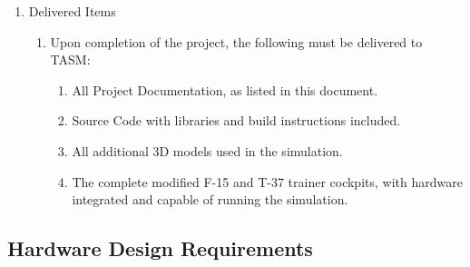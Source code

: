 \documentclass[12pt]{article} %
\begin{document}
\begin{enumerate}[label=\arabic*., leftmargin=*]
\begin{enumerate}[label=\arabic{enumi}.\arabic*., leftmargin=*]
\begin{enumerate}[label=\arabic{enumi}.\arabic{enumii}.\arabic*., leftmargin=*]
\begin{enumerate}[label=\arabic{enumi}.\arabic{enumii}.\arabic{enumiii}.\alph*., leftmargin=*]
				\item The user manual shall contain information on the start-up and shut-down of the simulation.
				\item The user manual shall contain the basic flow of the gameplay for each experience. 
				\item The user manual shall contain information on quickly restarting the simulation. 
			\end{enumerate}
			\item A detailed Maintenance Manual. 
			\begin{enumerate}[label=\arabic{enumi}.\arabic{enumii}.\arabic{enumiii}.\alph*., leftmargin=*]
				\item The maintenance manual shall contain a complete parts list.
				\item The maintenance manual shall contain software tutorials, including but not limited to installation processes, manual launching of the simulation, and updating packages.
				\item The maintenance manual shall contain hardware tutorials, including but not limited to the replacement of components (lights, controller, etc.) and confirming proper connections between hardware and software.
			\end{enumerate}
		\end{enumerate}
	\end{enumerate}
	\item Delivered Items
	\begin{enumerate}[label=\arabic{enumi}.\arabic*, leftmargin=*]
		\item Upon completion of the project, the following must be delivered to TASM:
		\begin{enumerate}[label=\arabic{enumi}.\arabic{enumii}.\arabic*, leftmargin=*]
			\item All Project Documentation, as listed in this document. 
			\item Source Code with libraries and build instructions included. 
			\item All additional 3D models used in the simulation.
			\item The complete modified F-15 and T-37 trainer cockpits, with hardware integrated and capable of running the simulation. 
		\end{enumerate}
	\end{enumerate}
\end{enumerate}

\subsection{Hardware Design Requirements}
\end{document}

